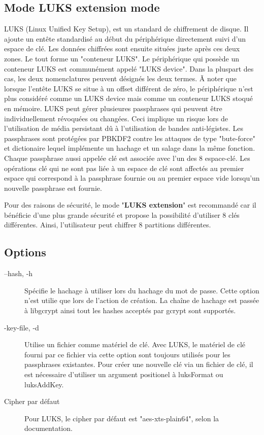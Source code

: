 \subsection{Mode LUKS extension mode}
LUKS (Linux Unified Key Setup), est un standard de chiffrement de disque. Il ajoute un entête standardisé au début du périphérique directement suivi d'un espace de clé. Les données chiffrées sont ensuite situées juste après ces deux zones. Le tout forme un "conteneur LUKS". Le périphérique qui possède un conteneur LUKS est communément appelé "LUKS device". Dans la pluspart des cas, les deux nomenclatures peuvent désignés les deux termes. Ã noter que lorsque l'entête LUKS se situe à un offset différent de zéro, le périphérique n'est plus considéré comme un LUKS device mais comme un conteneur LUKS stoqué en mémoire. LUKS peut gérer plusieures passphrases qui peuvent être individuellement révoquées ou changées. Ceci implique un risque lors de l'utilisation de média persistant dû à l'utilisation de  bandes anti-légistes. Les passphrases sont protégées par PBKDF2 contre les attaques de type "bute-force" et dictionaire lequel implémente un hachage et un salage dans la même fonction. Chaque passphrase aussi appelée clé est associée avec l'un des 8 espace-clé. Les opérations clé qui ne sont pas liée à un espace de clé sont affectés au premier espace qui correspond à la passphrase fournie ou au premier espace vide lorsqu'un nouvelle passphrase est fournie.

Pour des raisons de sécurité, le mode "\textbf{LUKS extension}" est recommandé car il bénéficie d'une plus grande sécurité et propose la possibilité d'utiliser 8 clés différentes. Ainsi, l'utilisateur peut chiffrer 8 partitions différentes.

\subsection{Options}
\begin{description}
	\item[--hash, -h] Spécifie le hachage à utiliser lors du hachage du mot de passe. Cette option n'est utilie que lors de l'action de création. La chaîne de hachage est passée à libgcrypt ainsi tout les hashes acceptés par gcrypt sont supportés.
	\item[-key-file, -d] Utilise un fichier comme matériel de clé. Avec LUKS, le matériel de clé fourni par ce fichier via cette option sont toujours utilisés pour les passphrases existantes. Pour créer une nouvelle clé via un fichier de clé, il est nécessaire d'utiliser un argument positionel à luksFormat ou luksAddKey.
	\item[Cipher par défaut] Pour LUKS, le cipher par défaut est "aes-xts-plain64", selon la documentation.
\end{description}

